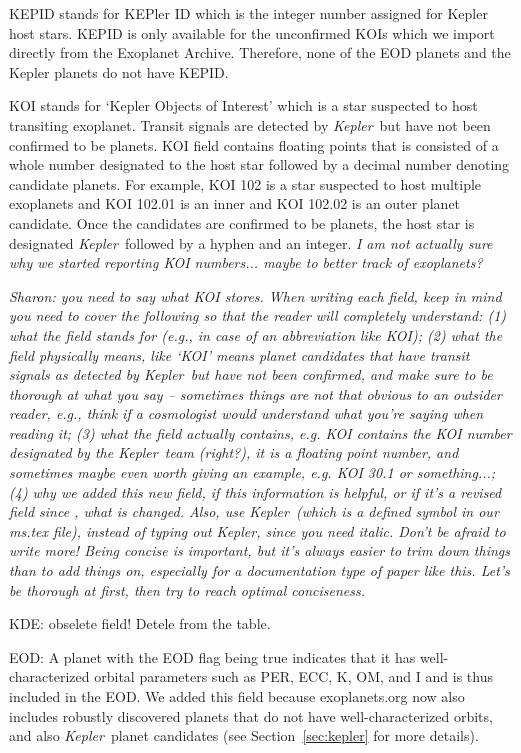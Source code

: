 \documentclass[11pt,preprint]{aastex}
\def\kepler{\textit{Kepler}}
\begin{document}
\begin{CJK*}{UTF8}{gbsn}
KEPID stands for KEPler ID which is the integer number assigned for Kepler host stars. KEPID is only available for the unconfirmed KOIs which we import directly from the Exoplanet Archive. Therefore, none of the EOD planets and the Kepler planets do not have KEPID.


KOI stands for `Kepler Objects of Interest' which is a star suspected to host transiting exoplanet. Transit signals are detected by \kepler\ but have not been confirmed to be planets. KOI field contains floating points that is consisted of a whole number designated to the host star followed by a decimal number denoting candidate planets. For example, KOI 102 is a star suspected to host multiple exoplanets and KOI 102.01 is an inner and KOI 102.02 is an outer planet candidate. Once the candidates are confirmed to be planets, the host star is designated \kepler\ followed by a hyphen and an integer. 
\textit {I am not actually sure why we started reporting KOI numbers... maybe to better track of exoplanets?}

\textit {Sharon: you need to say what KOI stores. When writing each
  field, keep in mind you need to cover the following so that the
  reader will completely understand: (1) what the field stands for
  (e.g., in case of an abbreviation like KOI); (2) what the field
  physically means, like `KOI' means planet candidates that have transit
  signals as detected by \kepler\ but have not been confirmed, and
  make sure to be thorough at what you say -- sometimes things are not
  that obvious to an outsider reader, e.g., think if a cosmologist
  would understand what you're saying when reading it; (3) what the
  field actually contains, e.g. KOI contains the KOI number designated
  by the \kepler\ team (right?), it is a floating point number, and
  sometimes maybe even worth giving an example, e.g. KOI 30.1 or
  something...; (4) why we added this new field, if this information
  is helpful, or if it's a revised field since \cite{Wright2011}, what
  is changed. Also, use \kepler\ (which is a defined symbol in our ms.tex file),
  instead of typing out Kepler, since you need italic.
  Don't be afraid to write more! Being concise is important, but it's
  always easier to trim down things than to add things on, especially
  for a documentation type of paper like this. Let's be thorough at
  first, then try to reach optimal conciseness.}

KDE: obselete field! Detele from the table.

EOD: A planet with the EOD flag being true indicates that it has
well-characterized orbital parameters such as PER, ECC, K, OM, and I
and is thus included in the EOD. We added this field because
exoplanets.org now also includes robustly discovered planets that do
not have well-characterized orbits, and also \kepler\ planet
candidates (see Section~\ref{sec:kepler} for more details).



\end{CJK*}
\end{document}
